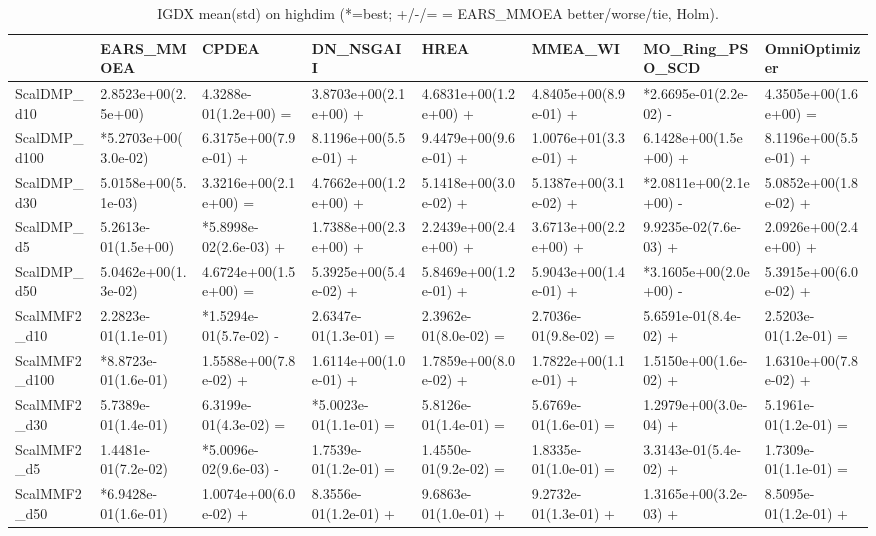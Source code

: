 \begin{table}[t]
\centering
\caption{IGDX mean(std) on highdim (*=best; +/-/= = EARS_MMOEA better/worse/tie, Holm).}
\label{tab:highdim_IGDX}
\begin{tabular}{llllllll}
\toprule
 & EARS\_MMOEA & CPDEA & DN\_NSGAII & HREA & MMEA\_WI & MO\_Ring\_PSO\_SCD & OmniOptimizer \\
\midrule
ScalDMP\_d10 & 2.8523e+00(2.5e+00) & 4.3288e-01(1.2e+00) = & 3.8703e+00(2.1e+00) + & 4.6831e+00(1.2e+00) + & 4.8405e+00(8.9e-01) + & *2.6695e-01(2.2e-02) - & 4.3505e+00(1.6e+00) = \\
ScalDMP\_d100 & *5.2703e+00(3.0e-02) & 6.3175e+00(7.9e-01) + & 8.1196e+00(5.5e-01) + & 9.4479e+00(9.6e-01) + & 1.0076e+01(3.3e-01) + & 6.1428e+00(1.5e+00) + & 8.1196e+00(5.5e-01) + \\
ScalDMP\_d30 & 5.0158e+00(5.1e-03) & 3.3216e+00(2.1e+00) = & 4.7662e+00(1.2e+00) + & 5.1418e+00(3.0e-02) + & 5.1387e+00(3.1e-02) + & *2.0811e+00(2.1e+00) - & 5.0852e+00(1.8e-02) + \\
ScalDMP\_d5 & 5.2613e-01(1.5e+00) & *5.8998e-02(2.6e-03) + & 1.7388e+00(2.3e+00) + & 2.2439e+00(2.4e+00) + & 3.6713e+00(2.2e+00) + & 9.9235e-02(7.6e-03) + & 2.0926e+00(2.4e+00) + \\
ScalDMP\_d50 & 5.0462e+00(1.3e-02) & 4.6724e+00(1.5e+00) = & 5.3925e+00(5.4e-02) + & 5.8469e+00(1.2e-01) + & 5.9043e+00(1.4e-01) + & *3.1605e+00(2.0e+00) - & 5.3915e+00(6.0e-02) + \\
ScalMMF2\_d10 & 2.2823e-01(1.1e-01) & *1.5294e-01(5.7e-02) - & 2.6347e-01(1.3e-01) = & 2.3962e-01(8.0e-02) = & 2.7036e-01(9.8e-02) = & 5.6591e-01(8.4e-02) + & 2.5203e-01(1.2e-01) = \\
ScalMMF2\_d100 & *8.8723e-01(1.6e-01) & 1.5588e+00(7.8e-02) + & 1.6114e+00(1.0e-01) + & 1.7859e+00(8.0e-02) + & 1.7822e+00(1.1e-01) + & 1.5150e+00(1.6e-02) + & 1.6310e+00(7.8e-02) + \\
ScalMMF2\_d30 & 5.7389e-01(1.4e-01) & 6.3199e-01(4.3e-02) = & *5.0023e-01(1.1e-01) = & 5.8126e-01(1.4e-01) = & 5.6769e-01(1.6e-01) = & 1.2979e+00(3.0e-04) + & 5.1961e-01(1.2e-01) = \\
ScalMMF2\_d5 & 1.4481e-01(7.2e-02) & *5.0096e-02(9.6e-03) - & 1.7539e-01(1.2e-01) = & 1.4550e-01(9.2e-02) = & 1.8335e-01(1.0e-01) = & 3.3143e-01(5.4e-02) + & 1.7309e-01(1.1e-01) = \\
ScalMMF2\_d50 & *6.9428e-01(1.6e-01) & 1.0074e+00(6.0e-02) + & 8.3556e-01(1.2e-01) + & 9.6863e-01(1.0e-01) + & 9.2732e-01(1.3e-01) + & 1.3165e+00(3.2e-03) + & 8.5095e-01(1.2e-01) + \\
\bottomrule
\end{tabular}
\end{table}
